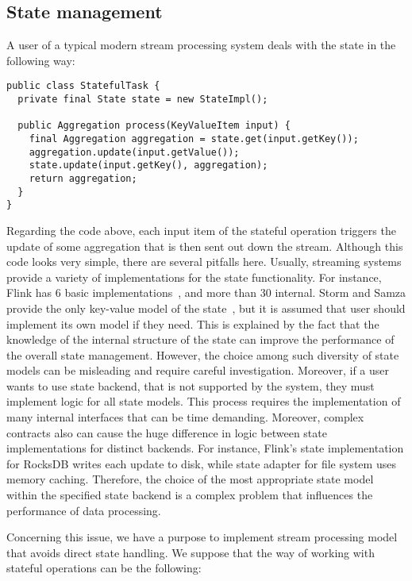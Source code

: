 
\subsection{State management}

A user of a typical modern stream processing system deals with the state in the following way:

\begin{lstlisting}
public class StatefulTask {
  private final State state = new StateImpl();

  public Aggregation process(KeyValueItem input) {
    final Aggregation aggregation = state.get(input.getKey());
    aggregation.update(input.getValue());
    state.update(input.getKey(), aggregation);
    return aggregation;
  }
}
\end{lstlisting}

Regarding the code above, each input item of the stateful operation triggers the update of some aggregation that is then sent out down the stream. Although this code looks very simple, there are several pitfalls here. Usually, streaming systems provide a variety of implementations for the state functionality. For instance, Flink has 6 basic implementations~\cite{apache:flink:state}, and more than 30 internal. Storm and Samza provide the only key-value model of the state~\cite{apache:storm:state, samza:state}, but it is assumed that user should implement its own model if they need. This is explained by the fact that the knowledge of the internal structure of the state can improve the performance of the overall state management. However, the choice among such diversity of state models can be misleading and require careful investigation. Moreover, if a user wants to use state backend, that is not supported by the system, they must implement logic for all state models. This process requires the implementation of many internal interfaces that can be time demanding. Moreover, complex contracts also can cause the huge difference in logic between state implementations for distinct backends. For instance, Flink's state implementation for RocksDB writes each update to disk, while state adapter for file system uses memory caching. Therefore, the choice of the most appropriate state model within the specified state backend is a complex problem that influences the performance of data processing.

Concerning this issue, we have a purpose to implement stream processing model that avoids direct state handling. We suppose that the way of working with stateful operations can be the following:


